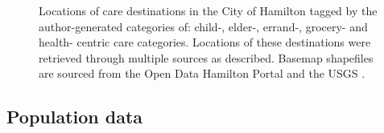 \documentclass[
  authoryear,
  preprint,
  3p]{elsarticle}
\begin{document}
\begin{figure}


\caption{\label{fig-Fig2}Locations of care destinations in the City of
Hamilton tagged by the author-generated categories of: child-, elder-,
errand-, grocery- and health- centric care categories. Locations of
these destinations were retrieved through multiple sources as described.
Basemap shapefiles are sourced from the Open Data Hamilton Portal
\citep{opendatahamiltonCityBoundary2023} and the USGS
\citep{greatlakesUSGS2010}.}

\end{figure}%

\subsection{Population data}\label{population-data}
\end{document}
